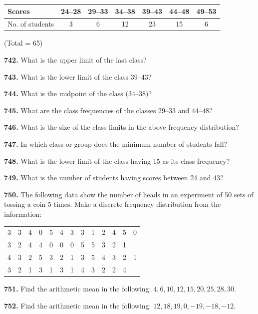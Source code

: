 \documentclass[11pt]{article}
\begin{document}
\begin{center}
\begin{tabular}{lcccccc}
\toprule
Scores & 24--28 & 29--33 & 34--38 & 39--43 & 44--48 & 49--53 \\
\midrule
No. of students & 3 & 6 & 12 & 23 & 15 & 6 \\
\bottomrule
\end{tabular}
\quad (Total = 65)
\end{center}

\bigskip
\noindent\textbf{742.} What is the upper limit of the last class?

\bigskip
\noindent\textbf{743.} What is the lower limit of the class $39$--$43$?

\bigskip
\noindent\textbf{744.} What is the midpoint of the class $(34$--$38)$?

\bigskip
\noindent\textbf{745.} What are the class frequencies of the classes $29$--$33$ and $44$--$48$?

\bigskip
\noindent\textbf{746.} What is the size of the class limits in the above frequency distribution?

\bigskip
\noindent\textbf{747.} In which class or group does the minimum number of students fall?

\bigskip
\noindent\textbf{748.} What is the lower limit of the class having 15 as its class frequency?

\bigskip
\noindent\textbf{749.} What is the number of students having scores between 24 and 43?

\bigskip
\noindent\textbf{750.} The following data show the number of heads in an experiment of 50 sets of tossing a coin 5 times. Make a discrete frequency distribution from the information:

\begin{center}
\begin{tabular}{ccccccccccccc}
3&3&4&0&5&4&3&3&1&2&4&5&0\\
3&2&4&4&0&0&0&5&5&3&2&1&\\
4&3&2&5&3&2&1&3&5&4&3&2&1\\
3&2&1&3&1&3&1&4&3&2&2&4&\\
\end{tabular}
\end{center}

\bigskip
\noindent\textbf{751.} Find the arithmetic mean in the following: $4,6,10,12,15,20,25,28,30$.

\bigskip
\noindent\textbf{752.} Find the arithmetic mean in the following: $12,18,19,0,-19,-18,-12$.
\end{document}
